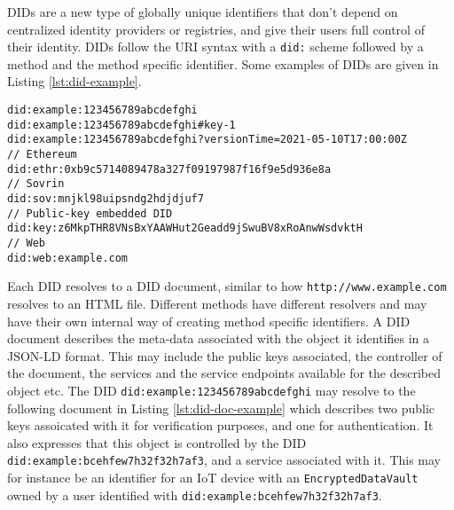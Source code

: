 \acrfull{DID}s \parencite{reed_sporny_longley_allen_grant_sabadello_2021} are a new type of globally unique identifiers that don't depend on centralized identity providers or registries, and give their users full control of their identity. \acrshort{DID}s follow the \acrshort{URI} syntax with a \lstinline{did:} scheme followed by a method and the method specific identifier. Some examples of \acrshort{DID}s are given in Listing \ref{lst:did-example}.

\begin{lstlisting}[label={lst:did-example}, caption={\acrlong{DID} examples}]
did:example:123456789abcdefghi
did:example:123456789abcdefghi#key-1
did:example:123456789abcdefghi?versionTime=2021-05-10T17:00:00Z
// Ethereum 
did:ethr:0xb9c5714089478a327f09197987f16f9e5d936e8a
// Sovrin
did:sov:mnjkl98uipsndg2hdjdjuf7
// Public-key embedded DID
did:key:z6MkpTHR8VNsBxYAAWHut2Geadd9jSwuBV8xRoAnwWsdvktH
// Web
did:web:example.com
\end{lstlisting}

Each \acrshort{DID} resolves to a \acrshort{DID} document, similar to how \lstinline{http://www.example.com} resolves to an HTML file. Different methods have different resolvers and may have their own internal way of creating method specific identifiers. A \acrshort{DID} document describes the meta-data associated with the object it identifies in a \acrshort{JSON-LD} format. This may include the public keys associated, the controller of the document, the services and the service endpoints available for the described object etc. The \acrshort{DID} \lstinline{did:example:123456789abcdefghi} may resolve to the following document in Listing \ref{lst:did-doc-example} which describes two public keys assoicated with it for verification purposes, and one for authentication. It also expresses that this object is controlled by the \acrshort{DID} \lstinline{did:example:bcehfew7h32f32h7af3}, and a service associated with it. This may for instance be an identifier for an \acrshort{IoT} device with an \lstinline{EncryptedDataVault} owned by a user identified with \lstinline{did:example:bcehfew7h32f32h7af3}.


